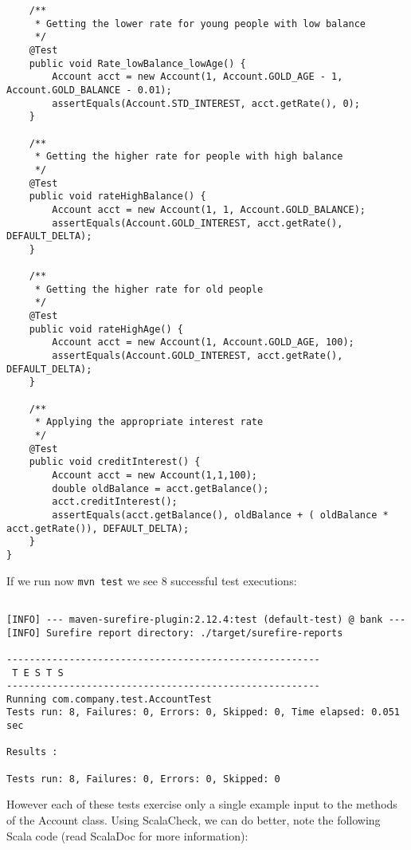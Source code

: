 \documentclass{article}
\begin{document}
\begin{lstlisting}
    /**
     * Getting the lower rate for young people with low balance
     */
    @Test
    public void Rate_lowBalance_lowAge() {
        Account acct = new Account(1, Account.GOLD_AGE - 1, Account.GOLD_BALANCE - 0.01);
        assertEquals(Account.STD_INTEREST, acct.getRate(), 0);
    }

    /**
     * Getting the higher rate for people with high balance
     */
    @Test
    public void rateHighBalance() {
        Account acct = new Account(1, 1, Account.GOLD_BALANCE);
        assertEquals(Account.GOLD_INTEREST, acct.getRate(), DEFAULT_DELTA);
    }

    /**
     * Getting the higher rate for old people 
     */
    @Test
    public void rateHighAge() {
        Account acct = new Account(1, Account.GOLD_AGE, 100);
        assertEquals(Account.GOLD_INTEREST, acct.getRate(), DEFAULT_DELTA);
    }

    /**
     * Applying the appropriate interest rate 
     */
    @Test
    public void creditInterest() {
        Account acct = new Account(1,1,100);
        double oldBalance = acct.getBalance();
        acct.creditInterest();
        assertEquals(acct.getBalance(), oldBalance + ( oldBalance * acct.getRate()), DEFAULT_DELTA);
    }
}
\end{lstlisting}

If we run now \texttt{mvn test} we see 8 successful test executions:

\begin{lstlisting}

[INFO] --- maven-surefire-plugin:2.12.4:test (default-test) @ bank ---
[INFO] Surefire report directory: ./target/surefire-reports

-------------------------------------------------------
 T E S T S
-------------------------------------------------------
Running com.company.test.AccountTest
Tests run: 8, Failures: 0, Errors: 0, Skipped: 0, Time elapsed: 0.051 sec

Results :

Tests run: 8, Failures: 0, Errors: 0, Skipped: 0
\end{lstlisting}

However each of these tests exercise only a single example input to the
methods of the Account class. Using ScalaCheck, we can do better, note
the following Scala code (read ScalaDoc for more information):
\end{document}
